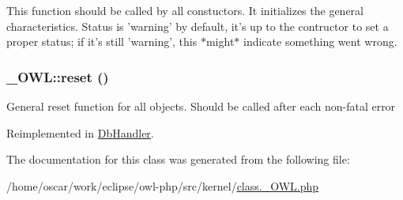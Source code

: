 This function should be called by all constuctors. It initializes the general characteristics. Status is 'warning' by default, it's up to the contructor to set a proper status; if it's still 'warning', this $\ast$might$\ast$ indicate something went wrong. \hypertarget{class__OWL_2f2a042bcf31965194c03033df0edc9b}{
\subsubsection{\setlength{\rightskip}{0pt plus 5cm}\_\-OWL::reset ()}}
\label{class__OWL_2f2a042bcf31965194c03033df0edc9b}


General reset function for all objects. Should be called after each non-fatal error 

Reimplemented in \hyperlink{classDbHandler_9982df4830f05803935bb31bac7fae3d}{DbHandler}.

The documentation for this class was generated from the following file:\begin{CompactItemize}
\item 
/home/oscar/work/eclipse/owl-php/src/kernel/\hyperlink{class_8__OWL_8php}{class.\_\-OWL.php}\end{CompactItemize}

